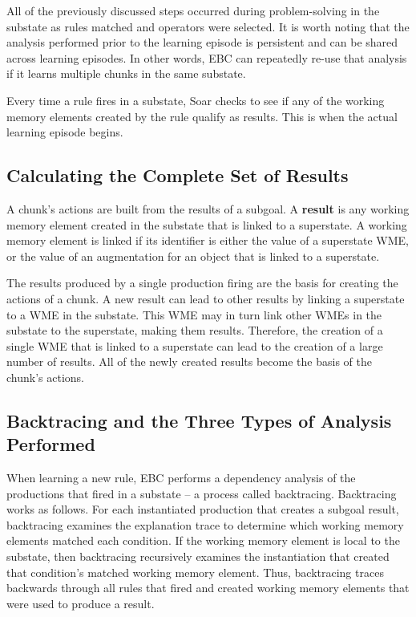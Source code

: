 All of the previously discussed steps occurred during problem-solving in the substate as rules matched and operators were selected.  It is worth noting that the analysis performed prior to the learning episode is persistent and can be shared across learning episodes.  In other words, EBC can repeatedly re-use that analysis if it learns multiple chunks in the same substate.

Every time a rule fires in a substate, Soar checks to see if any of the working memory elements created by the rule qualify as results.  This is when the actual learning episode begins.

\subsection{Calculating the Complete Set of Results}
\label{CHUNKING-during-results}

A chunk's actions are built from the results of a subgoal. A \textbf{result} is any working memory element created in the substate that is linked to a superstate. A working memory element is linked if its identifier is either the value of a superstate WME, or the value of an augmentation for an object that is linked to a superstate.

The results produced by a single production firing are the basis for creating the actions of a chunk. A new result can lead to other results by linking a superstate to a WME in the substate. This WME may in turn link other WMEs in the substate to the superstate, making them results. Therefore, the creation of a single WME that is linked to a superstate can lead to the creation of a large number of results. All of the newly created results become the basis of the chunk's actions.

\subsection{Backtracing and the Three Types of Analysis Performed}
\label{CHUNKING-during-backtracing}

When learning a new rule, EBC performs a dependency analysis of the productions that fired in a substate -- a process called backtracing. Backtracing works as follows.  For each instantiated production that creates a subgoal result, backtracing examines the explanation trace to determine which working memory elements matched each condition. If the working memory element is local to the substate, then backtracing recursively examines the instantiation that created that condition's matched working memory element. Thus, backtracing traces backwards through all rules that fired and created working memory elements that were used to produce a result.

